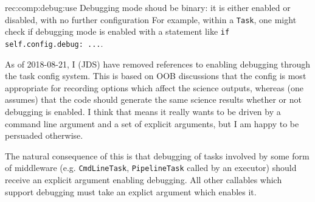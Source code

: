 \begin{recommendation}
    {rec:comp:debug:use}
    {Debugging mode shoud be binary: it is either enabled or disabled, with no further configuration}
    For example, within a \texttt{Task}, one might check if debugging mode is
    enabled with a statement like \texttt{if self.config.debug: ...}.
\end{recommendation}

\begin{note}
As of 2018-08-21, I (JDS) have removed references to enabling debugging
through the task config system. This is based on OOB discussions that the
config is most appropriate for recording options which affect the science
outputs, whereas (one assumes) that the code should generate the same science
results whether or not debugging is enabled. I think that means it really
wants to be driven by a command line argument and a set of explicit arguments,
but I am happy to be persuaded otherwise.
\end{note}

The natural consequence of this is that debugging of tasks involved by some
form of middleware (e.g. \texttt{CmdLineTask}, \texttt{PipelineTask} called by
an executor) should receive an explicit argument enabling debugging. All other
callables which support debugging must take an explict argument which enables
it.
